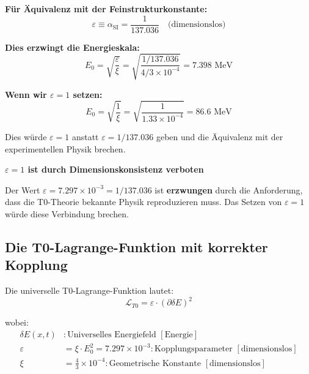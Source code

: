 \documentclass[12pt,a4paper]{article}
\numberwithin{equation}{section}
\newcommand{\xipar}{\xi}
\newcommand{\epsilonT}{\varepsilon}
\newcommand{\alphaSI}{\alpha_{\text{SI}}}
\newcommand{\calL}{\mathcal{L}}
\newcommand{\Eo}{E_0}
\begin{document}
	\textbf{Für Äquivalenz mit der Feinstrukturkonstante:}
	\begin{equation}
		\epsilonT \equiv \alphaSI = \frac{1}{137.036} \quad \text{(dimensionslos)}
		\label{eq:equivalence_simple}
	\end{equation}
	
	\textbf{Dies erzwingt die Energieskala:}
	\begin{equation}
		\Eo = \sqrt{\frac{ \epsilonT}{\xipar}} = \sqrt{\frac{1/137.036}{4/3 \times 10^{-4}}} = 7.398 \text{ MeV}
		\label{eq:e0_forced}
	\end{equation}
	
	\textbf{Wenn wir $\epsilonT = 1$ setzen:}
	\begin{equation}
		\Eo = \sqrt{\frac{1}{\xipar}} = \sqrt{\frac{1}{1.33 \times 10^{-4}}} = 86.6 \text{ MeV}
		\label{eq:e0_wrong}
	\end{equation}
	
	Dies würde $\epsilonT = 1$ anstatt $\epsilonT = 1/137.036$ geben und die Äquivalenz mit der experimentellen Physik brechen.
	
	\begin{tcolorbox}[title={\textbf{SCHLUSSFOLGERUNG}},colframe=blue,colback=blue!5]
		\textbf{$\epsilonT = 1$ ist durch Dimensionskonsistenz verboten}
		
		Der Wert $\epsilonT = 7.297 \times 10^{-3} = 1/137.036$ ist \textbf{erzwungen} durch die Anforderung, dass die T0-Theorie bekannte Physik reproduzieren muss. Das Setzen von $\epsilonT = 1$ würde diese Verbindung brechen.
	\end{tcolorbox}
	
	\subsection{Die T0-Lagrange-Funktion mit korrekter Kopplung}
	
	Die universelle T0-Lagrange-Funktion lautet:
	\begin{equation}
		\calL_{T0} = \epsilonT \cdot (\partial \delta E)^2
		\label{eq:t0_lagrangian}
	\end{equation}
	
	wobei:
	\begin{align}
		\delta E(x,t) &: \text{Universelles Energiefeld } [\text{Energie}]\\
		\epsilonT &= \xipar \cdot \Eo^2 = 7.297 \times 10^{-3} : \text{Kopplungsparameter } [\text{dimensionslos}]\\
		\xipar &= \frac{4}{3} \times 10^{-4} : \text{Geometrische Konstante } [\text{dimensionslos}]
	\end{align}
	
\end{document}
